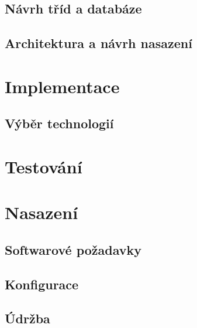 \documentclass[thesis=B,czech]{FITthesis}[2012/06/26]
\begin{document}
\section{Návrh tříd a databáze}


\section{Architektura a návrh nasazení}


\chapter{Implementace}

\section{Výběr technologií}



\chapter{Testování}


\chapter{Nasazení}


\section{Softwarové požadavky}

\section{Konfigurace}

\section{Údržba}
\end{document}

